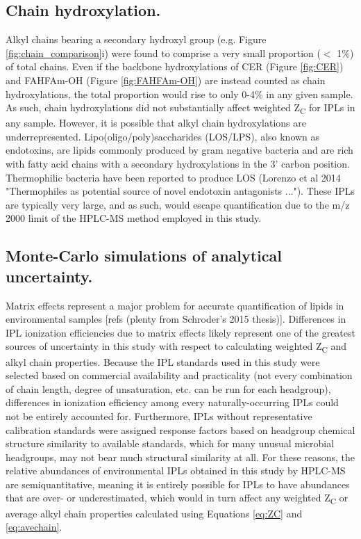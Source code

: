 \subsection{Chain hydroxylation.}
Alkyl chains bearing a secondary hydroxyl group (e.g. Figure \ref{fig:chain_comparison}i) were found to comprise a very small proportion ($<$ 1\%) of total chains. Even if the backbone hydroxylations of CER (Figure \ref{fig:CER}) and FAHFAm-OH (Figure \ref{fig:FAHFAm-OH}) are instead counted as chain hydroxylations, the total proportion would rise to only 0-4\% in any given sample. As such, chain hydroxylations did not substantially affect weighted Z\textsubscript{C} for IPLs in any sample. However, it is possible that alkyl chain hydroxylations are underrepresented. Lipo(oligo/poly)saccharides (LOS/LPS), also known as endotoxins, are lipids commonly produced by gram negative bacteria and are rich with fatty acid chains with a secondary hydroxylations in the 3' carbon position. Thermophilic bacteria have been reported to produce LOS (Lorenzo et al 2014 "Thermophiles as potential source of novel endotoxin antagonists ..."). These IPLs are typically very large, and as such, would escape quantification due to the m/z 2000 limit of the HPLC-MS method employed in this study.


\subsection{Monte-Carlo simulations of analytical uncertainty.} Matrix effects represent a major problem for accurate quantification of lipids in environmental samples [refs (plenty from Schroder’s 2015 thesis)]. Differences in IPL ionization efficiencies due to matrix effects likely represent one of the greatest sources of uncertainty in this study with respect to calculating weighted Z\textsubscript{C} and alkyl chain properties. Because the IPL standards used in this study were selected based on commercial availability and practicality (not every combination of chain length, degree of unsaturation, etc. can be run for each headgroup), differences in ionization efficiency among every naturally-occurring IPLs could not be entirely accounted for. Furthermore, IPLs without representative calibration standards were assigned response factors based on headgroup chemical structure similarity to available standards, which for many unusual microbial headgroups, may not bear much structural similarity at all. For these reasons, the relative abundances of environmental IPLs obtained in this study by HPLC-MS are semiquantitative, meaning it is entirely possible for IPLs to have abundances that are over- or underestimated, which would in turn affect any weighted Z\textsubscript{C} or average alkyl chain properties calculated using Equations \ref{eq:ZC} and \ref{eq:avechain}.

